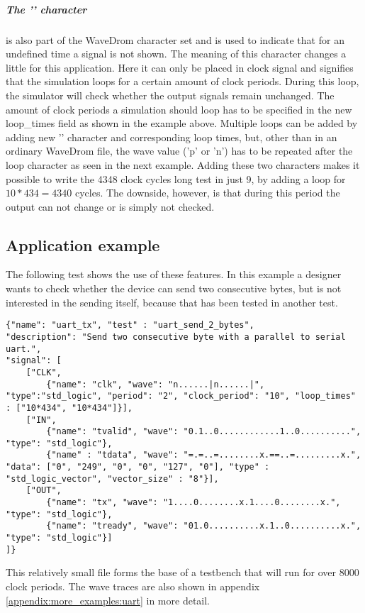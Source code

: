 \subparagraph{The '\textbar' character} is also part of the WaveDrom character set and is used to indicate that for an undefined time a signal is not shown. The meaning of this character changes a little for this application. Here it can only be placed in clock signal and signifies that the simulation loops for a certain amount of clock periods. During this loop, the simulator will check whether the output signals remain unchanged. The amount of clock periods a simulation should loop has to be specified in the new loop\_times field as shown in the example above. Multiple loops can be added by adding new '\textbar' character and corresponding loop times, but, other than in an ordinary WaveDrom file, the wave value ('p' or 'n') has to be repeated after the loop character as seen in the next example.
\npar
Adding these two characters makes it possible to write the 4348 clock cycles long test in just 9, by adding a loop for $10*434 = 4340$ cycles. The downside, however, is that during this period the output can not change or is simply not checked.
\newpage
\subsection{Application example}
The following test shows the use of these features. In this example a designer wants to check whether the device can send two consecutive bytes, but is not interested in the sending itself, because that has been tested in another test.
\begin{lstlisting}[style=json, caption={Source file for creating third transmission test for the UART design in \ref{appendix:uart}}, label={json:uart_2_bytes}]
{"name": "uart_tx", "test" : "uart_send_2_bytes", 
"description": "Send two consecutive byte with a parallel to serial uart.", 
"signal": [
	["CLK",
		{"name": "clk", "wave": "n......|n......|", "type":"std_logic", "period": "2", "clock_period": "10", "loop_times" : ["10*434", "10*434"]}],
	["IN",
		{"name": "tvalid", "wave": "0.1..0............1..0..........", "type": "std_logic"},
		{"name" : "tdata", "wave": "=.=..=........x.==..=.........x.", "data": ["0", "249", "0", "0", "127", "0"], "type" : "std_logic_vector", "vector_size" : "8"}],
	["OUT",
		{"name": "tx", "wave": "1....0........x.1....0........x.", "type": "std_logic"},
		{"name": "tready", "wave": "01.0..........x.1..0..........x.", "type": "std_logic"}]
]}
\end{lstlisting}\noindent
{}\nline
This relatively small file forms the base of a testbench that will run for over 8000 clock periods. The wave traces are also shown in appendix \ref{appendix:more_examples:uart} in more detail.
